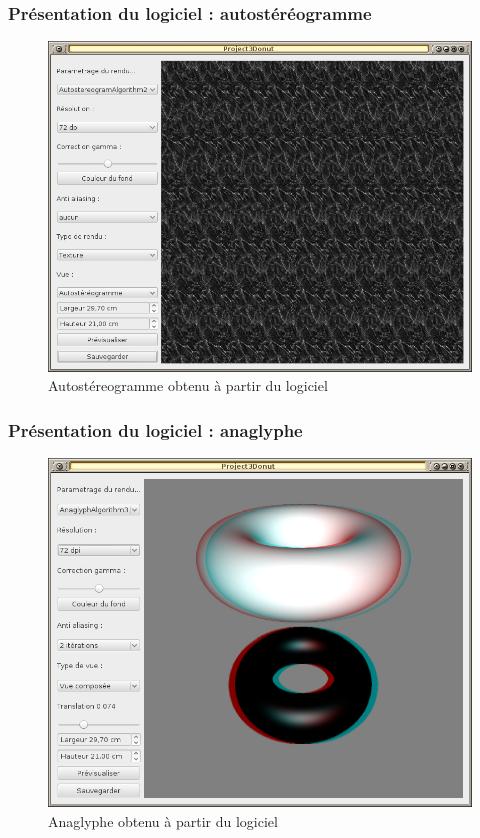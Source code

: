 \documentclass{beamer}
\begin{document}
%
\begin{frame}
\frametitle{Présentation du logiciel : autostéréogramme}
\begin{figure}
\centering
\includegraphics[scale=0.31]{renduautostereogrammes.png}
\caption{Autostéreogramme obtenu à partir du logiciel}
\end{figure}
\end{frame}

%
\begin{frame}
\frametitle{Présentation du logiciel : anaglyphe}
\begin{figure}
\centering
\includegraphics[scale=0.31]{renduanaglyphe.png}
\caption{Anaglyphe obtenu à partir du logiciel}
\end{figure}
\end{frame}
\end{document}
